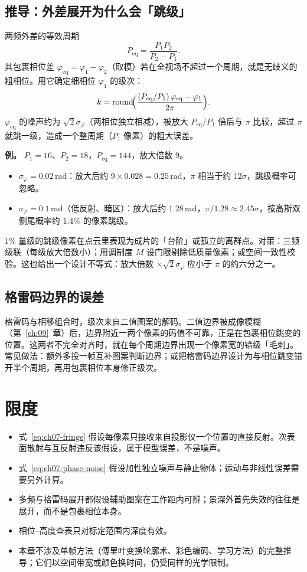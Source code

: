 \subsection{推导：外差展开为什么会「跳级」}

两频外差的等效周期
\[
  P_{\mathrm{eq}}=\frac{P_1P_2}{P_2-P_1}.
\]
其包裹相位差 $\varphi_{\mathrm{eq}}=\varphi_1-\varphi_2$（取模）若在全视场不超过一个周期，就是无歧义的粗相位。用它确定细相位 $\varphi_1$ 的级次：
\[
  k=\operatorname{round}\!\Bigl(\frac{(P_{\mathrm{eq}}/P_1)\,\varphi_{\mathrm{eq}}-\varphi_1}{2\pi}\Bigr).
\]
$\varphi_{\mathrm{eq}}$ 的噪声约为 $\sqrt2\sigma_\varphi$（两相位独立相减），被放大 $P_{\mathrm{eq}}/P_1$ 倍后与 $\pi$ 比较，超过 $\pi$ 就跳一级，造成一个整周期（$P_1$ 像素）的粗大误差。

\textbf{例。} $P_1=16$、$P_2=18$，$P_{\mathrm{eq}}=144$，放大倍数 $9$。
\begin{itemize}
  \item $\sigma_\varphi=0.02\,\mathrm{rad}$：放大后约 $9\times0.028=0.25\,\mathrm{rad}$，$\pi$ 相当于约 $12\sigma$，跳级概率可忽略。
  \item $\sigma_\varphi=0.1\,\mathrm{rad}$（低反射、暗区）：放大后约 $1.28\,\mathrm{rad}$，$\pi/1.28\approx2.45\sigma$，按高斯双侧尾概率约 $1.4\%$ 的像素跳级。
\end{itemize}
$1\%$ 量级的跳级像素在点云里表现为成片的「台阶」或孤立的离群点。对策：三频级联（每级放大倍数小）；用调制度 $M$ 设门限剔除低质量像素；或空间一致性校验。这也给出一个设计不等式：放大倍数 $\times\sqrt2\sigma_\varphi$ 应小于 $\pi$ 的约六分之一。

\subsection{格雷码边界的误差}

格雷码与相移组合时，级次来自二值图案的解码。二值边界被成像模糊（第~\ref{ch:09}~章）后，边界附近一两个像素的码值不可靠，正是在包裹相位跳变的位置。这两者不完全对齐时，就在每个周期边界出现一个像素宽的错级「毛刺」。常见做法：额外多投一帧互补图案判断边界；或把格雷码边界设计为与相位跳变错开半个周期，再用包裹相位本身修正级次。

\section{限度}
\label{sec:ch06-limits}

\begin{itemize}
  \item 式~\eqref{eq:ch07-fringe} 假设每像素只接收来自投影仪一个位置的直接反射。次表面散射与互反射违反该假设，属于模型误差，不是噪声。
  \item 式~\eqref{eq:ch07-phase-noise} 假设加性独立噪声与静止物体；运动与非线性误差需要另外计算。
  \item 多频与格雷码展开都假设辅助图案在工作距内可辨；景深外首先失效的往往是展开，而不是包裹相位本身。
  \item 相位–高度查表只对标定范围内深度有效。
  \item 本章不涉及单帧方法（傅里叶变换轮廓术、彩色编码、学习方法）的完整推导；它们以空间带宽或颜色换时间，仍受同样的光学限制。
\end{itemize}

